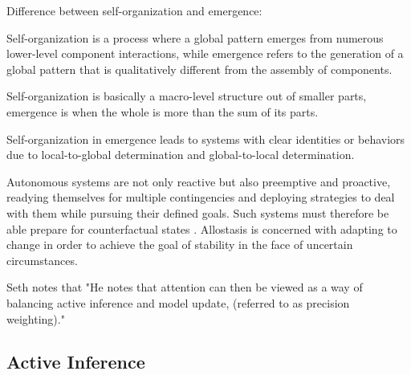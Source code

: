 Difference between self-organization and emergence:

Self-organization is a process where a global pattern emerges from numerous lower-level component interactions, while emergence refers to the generation of a global pattern that is qualitatively different from the assembly of components.

Self-organization is basically a macro-level structure out of smaller parts, emergence is when the whole is more than the sum of its parts.

Self-organization in emergence leads to systems with clear identities or behaviors due to local-to-global determination and global-to-local determination.


Autonomous systems are not only reactive but also preemptive and proactive, readying themselves for multiple contingencies and deploying strategies to deal with them while pursuing their defined goals. 
Such systems must therefore be able prepare for counterfactual states . 
Allostasis is concerned with adapting to change in order to achieve the goal of stability in the face of uncertain circumstances. 

Seth notes that "He notes that attention can then be viewed as a way of balancing active inference and model update, (referred to as precision weighting)."

\subsection{Active Inference} 

